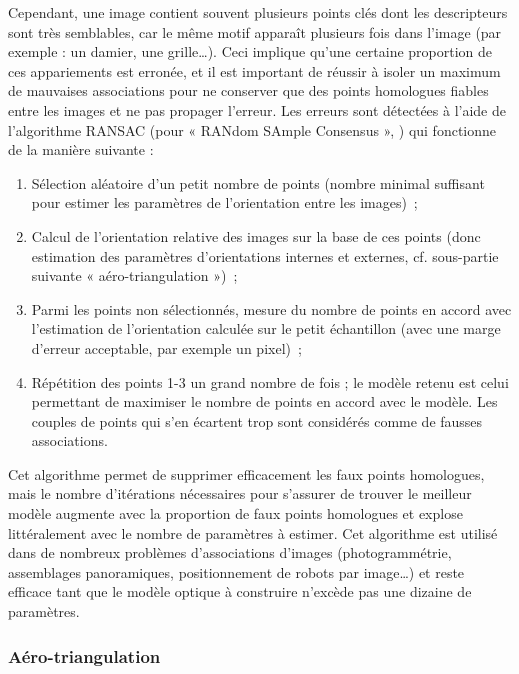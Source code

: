 Cependant, une image contient souvent plusieurs points clés dont les descripteurs sont très semblables, car le même motif apparaît plusieurs fois dans l’image (par exemple : un damier, une grille…). Ceci implique qu’une certaine proportion de ces appariements est erronée, et il est important de réussir à isoler un maximum de mauvaises associations pour ne conserver que des points homologues fiables entre les images et ne pas propager l’erreur. Les erreurs sont détectées à l’aide de l’algorithme RANSAC (pour « RANdom SAmple Consensus », \citep{fischler_random_1981}) qui fonctionne de la manière suivante :

\newpage

\begin{enumerate}
    \item Sélection aléatoire d’un petit nombre de points (nombre minimal suffisant pour estimer les paramètres de l’orientation entre les images)~;
    
    \item Calcul de l’orientation relative des images sur la base de ces points (donc estimation des paramètres d’orientations internes et externes, cf. sous-partie suivante « aéro-triangulation »)~;
    
    \item Parmi les points non sélectionnés, mesure du nombre de points en accord avec l’estimation de l’orientation calculée sur le petit échantillon (avec une marge d’erreur acceptable, par exemple un pixel)~;
    
    \item Répétition des points 1-3 un grand nombre de fois ; le modèle retenu est celui permettant de maximiser le nombre de points en accord avec le modèle. Les couples de points qui s’en écartent trop sont considérés comme de fausses associations.
\end{enumerate}

Cet algorithme permet de supprimer efficacement les faux points homologues, mais le nombre d’itérations nécessaires pour s’assurer de trouver le meilleur modèle augmente avec la proportion de faux points homologues et explose littéralement avec le nombre de paramètres à estimer. Cet algorithme est utilisé dans de nombreux problèmes d’associations d’images (photogrammétrie, assemblages panoramiques, positionnement de robots par image…) et reste efficace tant que le modèle optique à construire n’excède pas une dizaine de paramètres.

\subsubsection{Aéro-triangulation}

